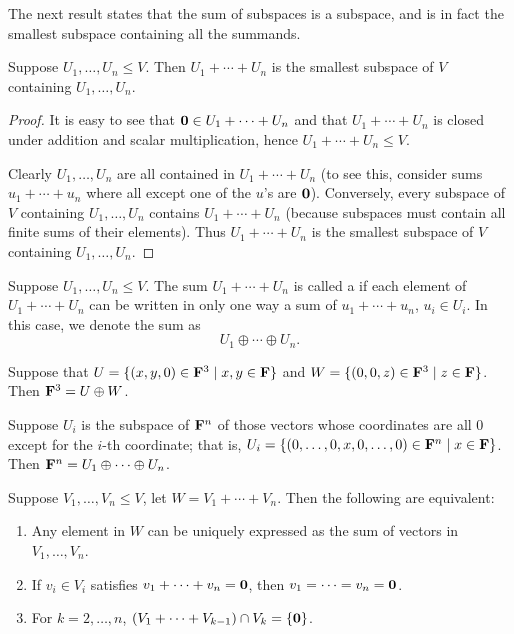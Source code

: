 The next result states that the sum of subspaces is a subspace, and is in fact the smallest subspace containing all the summands.

\begin{proposition}
Suppose $U_1,\dots,U_n\le V$. Then $U_1+\cdots+U_n$ is the smallest subspace of $V$ containing $U_1,\dots,U_n$.
\end{proposition}

\begin{proof}
It is easy to see that $\vb{0}\in U_1+\cdots+U_n$ and that $U_1+\cdots+U_n$ is closed under addition and scalar multiplication, hence $U_1+\cdots+U_n\le V$.

Clearly $U_1,\dots,U_n$ are all contained in $U_1+\cdots+U_n$ (to see this, consider sums $u_1+\cdots+u_n$ where all except one of the $u$'s are $\vb{0}$). Conversely, every subspace of $V$ containing $U_1,\dots,U_n$ contains $U_1+\cdots+U_n$ (because subspaces must contain all finite sums of their elements). Thus $U_1+\cdots+U_n$ is the smallest subspace of $V$ containing $U_1,\dots,U_n$.
\end{proof}

\begin{definition}
Suppose $U_1,\dots,U_n\le V$. The sum $U_1+\cdots+U_n$ is called a  if each element of $U_1+\cdots+U_n$ can be written in only one way a sum of $u_1+\cdots+u_n$, $u_i\in U_i$. In this case, we denote the sum as
\[U_1\oplus\cdots\oplus U_n.\]
\end{definition}

\begin{example}
Suppose that $U=\{(x,y,0)\in\mathbf F^3\mid x,y\in\mathbf F\}$ and $W=\{(0,0,z)\in\mathbf F^3\mid z\in\mathbf F\}$. Then $\mathbf F^3=U\oplus W$.
\end{example}

\begin{example}
Suppose $U_i$ is the subspace of $\mathbf F^n$ of those vectors whose coordinates are all 0 except for the $i$-th coordinate; that is, $U_i=\{(0,\dots,0,x,0,\dots,0)\in\mathbf F^n\mid x\in\mathbf F\}$. Then $\mathbf F^n=U_1\oplus\cdots\oplus U_n$.
\end{example}

\begin{lemma}\label{lemma:condition-direct-sum}
Suppose $V_1,\dots,V_n\le V$, let $W=V_1+\cdots+V_n$. Then the following are equivalent:
\begin{enumerate}[label=(\roman*)]
\item Any element in $W$ can be uniquely expressed as the sum of vectors in $V_1,\dots,V_n$.
\item If $v_i\in V_i$ satisfies $v_1+\cdots+v_n=\vb{0}$, then $v_1=\cdots=v_n=\vb{0}$.
\item For $k=2,\dots,n$, $(V_1+\cdots+V_{k-1})\cap V_k=\{\vb{0}\}$.
\end{enumerate}
\end{lemma}


